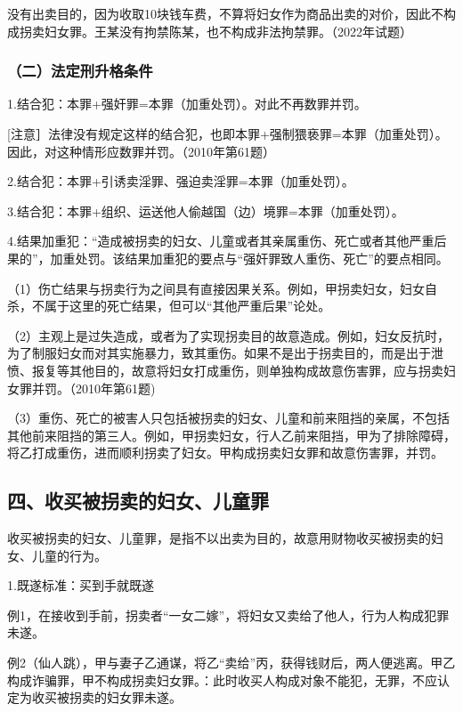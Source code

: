 没有出卖目的，因为收取10块钱车费，不算将妇女作为商品出卖的对价，因此不构成拐卖妇女罪。王某没有拘禁陈某，也不构成非法拘禁罪。（2022年试题）


\subsubsection*{（二）法定刑升格条件}

1.结合犯：本罪+强奸罪=本罪（加重处罚）。对此不再数罪并罚。

[注意］法律没有规定这样的结合犯，也即本罪+强制猥亵罪=本罪（加重处罚）。因此，对这种情形应数罪并罚。（2010年第61题）

2.结合犯：本罪+引诱卖淫罪、强迫卖淫罪=本罪（加重处罚）。

3.结合犯：本罪+组织、运送他人偷越国（边）境罪=本罪（加重处罚）。

4.结果加重犯：“造成被拐卖的妇女、儿童或者其亲属重伤、死亡或者其他严重后果的”，加重处罚。该结果加重犯的要点与“强奸罪致人重伤、死亡”的要点相同。

（1）伤亡结果与拐卖行为之间具有直接因果关系。例如，甲拐卖妇女，妇女自杀，不属于这里的死亡结果，但可以“其他严重后果”论处。

（2）主观上是过失造成，或者为了实现拐卖目的故意造成。例如，妇女反抗时，为了制服妇女而对其实施暴力，致其重伤。如果不是出于拐卖目的，而是出于泄愤、报复等其他目的，故意将妇女打成重伤，则单独构成故意伤害罪，应与拐卖妇女罪并罚。（2010年第61题)

（3）重伤、死亡的被害人只包括被拐卖的妇女、儿童和前来阻挡的亲属，不包括其他前来阻挡的第三人。例如，甲拐卖妇女，行人乙前来阻挡，甲为了排除障碍，将乙打成重伤，进而顺利拐卖了妇女。甲构成拐卖妇女罪和故意伤害罪，并罚。

\subsection*{四、收买被拐卖的妇女、儿童罪}

收买被拐卖的妇女、儿童罪，是指不以出卖为目的，故意用财物收买被拐卖的妇女、儿童的行为。

1.既遂标准：买到手就既遂

例1，在接收到手前，拐卖者“一女二嫁”，将妇女又卖给了他人，行为人构成犯罪未遂。

例2（仙人跳），甲与妻子乙通谋，将乙“卖给”丙，获得钱财后，两人便逃离。甲乙构成诈骗罪，甲不构成拐卖妇女罪。：此时收买人构成对象不能犯，无罪，不应认定为收买被拐卖的妇女罪未遂。

